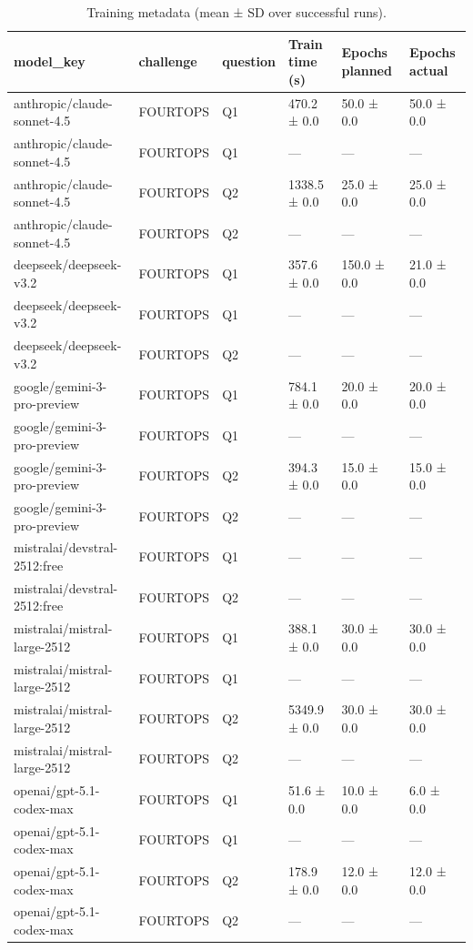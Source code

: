 \begin{table}
\caption{Training metadata (mean ± SD over successful runs).}
\label{tab:benchmark_metadata_training}
\begin{tabular}{llllll}
\toprule
model\_key & challenge & question & Train time (s) & Epochs planned & Epochs actual \\
\midrule
anthropic/claude-sonnet-4.5 & FOURTOPS & Q1 & 470.2 ± 0.0 & 50.0 ± 0.0 & 50.0 ± 0.0 \\
anthropic/claude-sonnet-4.5 & FOURTOPS & Q1 & — & — & — \\
anthropic/claude-sonnet-4.5 & FOURTOPS & Q2 & 1338.5 ± 0.0 & 25.0 ± 0.0 & 25.0 ± 0.0 \\
anthropic/claude-sonnet-4.5 & FOURTOPS & Q2 & — & — & — \\
deepseek/deepseek-v3.2 & FOURTOPS & Q1 & 357.6 ± 0.0 & 150.0 ± 0.0 & 21.0 ± 0.0 \\
deepseek/deepseek-v3.2 & FOURTOPS & Q1 & — & — & — \\
deepseek/deepseek-v3.2 & FOURTOPS & Q2 & — & — & — \\
google/gemini-3-pro-preview & FOURTOPS & Q1 & 784.1 ± 0.0 & 20.0 ± 0.0 & 20.0 ± 0.0 \\
google/gemini-3-pro-preview & FOURTOPS & Q1 & — & — & — \\
google/gemini-3-pro-preview & FOURTOPS & Q2 & 394.3 ± 0.0 & 15.0 ± 0.0 & 15.0 ± 0.0 \\
google/gemini-3-pro-preview & FOURTOPS & Q2 & — & — & — \\
mistralai/devstral-2512:free & FOURTOPS & Q1 & — & — & — \\
mistralai/devstral-2512:free & FOURTOPS & Q2 & — & — & — \\
mistralai/mistral-large-2512 & FOURTOPS & Q1 & 388.1 ± 0.0 & 30.0 ± 0.0 & 30.0 ± 0.0 \\
mistralai/mistral-large-2512 & FOURTOPS & Q1 & — & — & — \\
mistralai/mistral-large-2512 & FOURTOPS & Q2 & 5349.9 ± 0.0 & 30.0 ± 0.0 & 30.0 ± 0.0 \\
mistralai/mistral-large-2512 & FOURTOPS & Q2 & — & — & — \\
openai/gpt-5.1-codex-max & FOURTOPS & Q1 & 51.6 ± 0.0 & 10.0 ± 0.0 & 6.0 ± 0.0 \\
openai/gpt-5.1-codex-max & FOURTOPS & Q1 & — & — & — \\
openai/gpt-5.1-codex-max & FOURTOPS & Q2 & 178.9 ± 0.0 & 12.0 ± 0.0 & 12.0 ± 0.0 \\
openai/gpt-5.1-codex-max & FOURTOPS & Q2 & — & — & — \\

\end{tabular}
\end{table}
